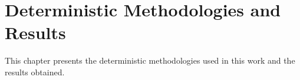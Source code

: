 \chapter{Deterministic Methodologies and Results}
\label{chp:deterministic-methodologies-and-results}

This chapter presents the deterministic methodologies used in this work and the results obtained.